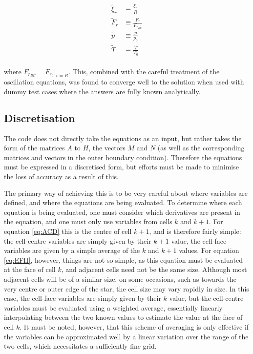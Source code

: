 \documentclass[11pt]{amsart}
\begin{document}
\begin{align}
\tilde{\xi}_{r} &\equiv \frac{\xi_{r}}{R} \\
\tilde{F}_{r} &\equiv \frac{F_{r}}{F_{r_{BC}}} \\
\tilde{p} &\equiv \frac{p}{p_{0}} \\
\tilde{T} &\equiv \frac{T}{T_{0}}
\end{align}
\\
where $F_{r_{BC}} = F_{r_{0}} |_{r=R}$.  This, combined with the careful treatment of the oscillation equations, was found to converge well to the solution when used with dummy test cases where the answers are fully known analytically.

\fi


\subsection{Discretisation}   \label{Implement:Disc}

The code does not directly take the equations as an input, but rather takes the form of the matrices $A$ to $H$, the vectors $M$ and $N$ (as well as the corresponding matrices and vectors in the outer boundary condition).  Therefore the equations must be expressed in a discretised form, but efforts must be made to minimise the loss of accuracy as a result of this.

The primary way of achieving this is to be very careful about where variables are defined, and where the equations are being evaluated.  To determine where each equation is being evaluated, one must consider which derivatives are present in the equation, and one must only use variables from cells $k$ and $k+1$.  For equation \ref{eq:ACD} this is the centre of cell $k+1$, and is therefore fairly simple: the cell-centre variables are simply given by their $k+1$ value, the cell-face variables are given by a simple average of the $k$ and $k+1$ values.  For equation \ref{eq:EFH}, however, things are not so simple, as this equation must be evaluated at the face of cell $k$, and adjacent cells need not be the same size.  Although most adjacent cells will be of a similar size, on some occasions, such as towards the very centre or outer edge of the star, the cell size may vary rapidly in size.  In this case, the cell-face variables are simply given by their $k$ value, but the cell-centre variables must be evaluated using a weighted average, essentially linearly interpolating between the two known values to estimate the value at the face of cell $k$.  It must be noted, however, that this scheme of averaging is only effective if the variables can be approximated well by a linear variation over the range of the two cells, which necessitates a sufficiently fine grid.
\end{document}
